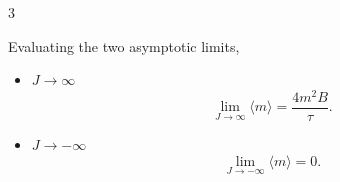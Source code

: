 \documentclass[11pt]{article}
\begin{document}
\begin{problem}{3}
\begin{enumerate}[label=(\alph*)]
\begin{answer}
\begin{equation}
          \end{equation}
          Evaluating the two asymptotic limits,
          \begin{itemize}
                  \item \( J \rightarrow \infty \)
            \begin{equation}
              \lim_{J \to \infty} \langle m \rangle = \frac{4m^2 B}{\tau}.
            \end{equation}
                  \item \( J \rightarrow -\infty \)
            \begin{equation}
              \lim_{J \to -\infty} \langle m \rangle = 0.
            \end{equation}
          \end{itemize}
        \end{answer}
  \end{enumerate}
\end{problem}
\end{document}
